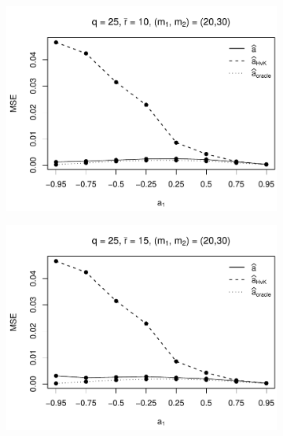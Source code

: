 \begin{figure}[p]
\begin{subfigure}[b]{0.45\textwidth}
\includegraphics[width=\textwidth]{Plots/Robustness/MSE_a1_T=500_slope=10_(q,K1,K2,M1,M2)=(25,2,10,20,30).pdf}
\end{subfigure}
\hspace{0.25cm}
\begin{subfigure}[b]{0.45\textwidth}
\includegraphics[width=\textwidth]{Plots/Robustness/MSE_a1_T=500_slope=10_(q,K1,K2,M1,M2)=(25,2,15,20,30).pdf}
\end{subfigure}


\end{figure}
